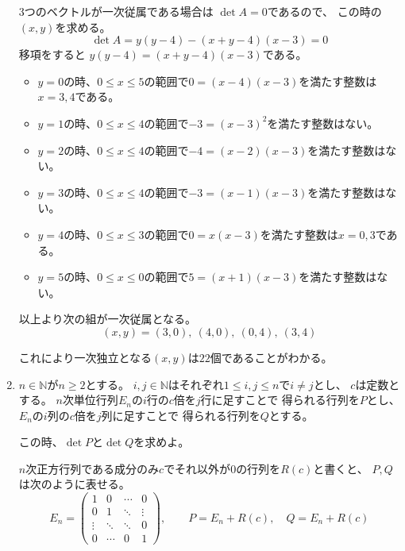 \documentclass[12pt,b5paper]{ltjsarticle}
\begin{document}
\begin{enumerate}
      3つのベクトルが一次従属である場合は
      $\det A = 0$であるので、
      この時の$(x,y)$を求める。
      \begin{equation}
       \det A = y(y-4) - (x+y-4)(x-3) = 0
      \end{equation}
      移項をすると
      $y(y-4)=(x+y-4)(x-3)$である。

      \begin{itemize}
       \item
            $y=0$の時、$0\leq x \leq 5$の範囲で$0=(x-4)(x-3)$を満たす整数は$x=3,4$である。
       \item
            $y=1$の時、$0\leq x \leq 4$の範囲で$-3=(x-3)^2$を満たす整数はない。
       \item
            $y=2$の時、$0\leq x \leq 4$の範囲で$-4=(x-2)(x-3)$を満たす整数はない。
       \item
            $y=3$の時、$0\leq x \leq 4$の範囲で$-3=(x-1)(x-3)$を満たす整数はない。
       \item
            $y=4$の時、$0\leq x \leq 3$の範囲で$0=x(x-3)$を満たす整数は$x=0,3$である。
       \item
            $y=5$の時、$0\leq x \leq 0$の範囲で$5=(x+1)(x-3)$を満たす整数はない。
      \end{itemize}

      以上より次の組が一次従属となる。
      \begin{equation}
       (x,y)=(3,0),\ (4,0),\ (0,4),\ (3,4)
      \end{equation}

      これにより一次独立となる$(x,y)$は$22$個であることがわかる。





      \hrulefill

 \item
      $n\in\mathbb{N}$が$n\geq2$とする。
      $i,j\in\mathbb{N}$はそれぞれ$1\leq i,j \leq n$で$i\ne j$とし、
      $c$は定数とする。
      $n$次単位行列$E_n$の$i$行の$c$倍を$j$行に足すことで
      得られる行列を$P$とし、
      $E_n$の$i$列の$c$倍を$j$列に足すことで
      得られる行列を$Q$とする。

      この時、$\det P$と$\det Q$を求めよ。

      \dotfill

      $n$次正方行列である成分のみ$c$でそれ以外が$0$の行列を$R(c)$と書くと、
      $P,Q$は次のように表せる。
      \begin{equation}
       E_n=
        \begin{pmatrix}
         1 & 0 & \cdots & 0\\
         0 & 1 & \ddots & \vdots\\
         \vdots & \ddots & \ddots& 0\\
         0 & \cdots & 0 & 1
        \end{pmatrix}
        ,\qquad
        P=E_n + R(c)
        ,\quad
        Q=E_n + R(c)
      \end{equation}


\end{enumerate}
\end{document}
